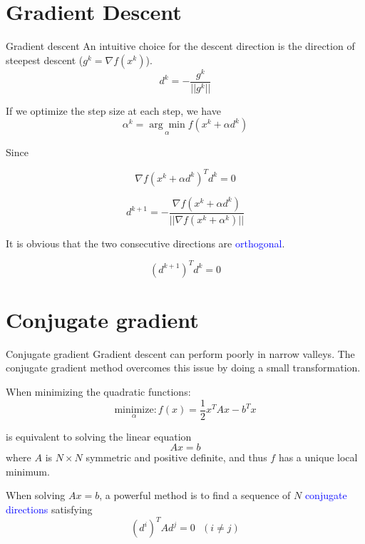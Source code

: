 \documentclass{beamer}
\begin{document}
\section{Gradient Descent}
\begin{frame}{Gradient descent}
An intuitive choice for the descent direction is the direction of steepest descent ($g^k = \nabla f(x^k)$).
\begin{equation*}
    d^k = - \frac{g^k}{||g^k||}
\end{equation*}

If we optimize the step size at each step, we have
\begin{equation*}
    \alpha^k = \underset{\alpha}{\arg \min} f(x^k + \alpha d^k)
\end{equation*}

Since 

\begin{equation*}
    \nabla f(x^k + \alpha d^k)^T d^k = 0
\end{equation*}

\begin{equation*}
    d^{k+1} = - \frac{\nabla f(x^k + \alpha d^k)}{||\nabla f(x^k + \alpha^k)||}
\end{equation*}

It is obvious that the two consecutive directions are \textcolor{blue}{orthogonal}.

\begin{equation*}
	(d^{k+1})^T d^k = 0
\end{equation*}

\end{frame}

\section{Conjugate gradient}
\begin{frame}{Conjugate gradient}
Gradient descent can perform poorly in narrow valleys. The conjugate gradient method overcomes this issue by doing a small transformation.

When minimizing the quadratic functions:
\begin{equation*}
    \underset{\alpha}{\textrm{minimize}}: f(x) = \frac{1}{2} x^T A x - b^T x 
\end{equation*}

is equivalent to solving the linear equation
\begin{equation*}
    Ax = b
\end{equation*}
where $A$ is $N \times N$ symmetric and positive definite, and thus $f$ has a unique local minimum.

When solving $Ax = b$, a powerful method is to find a sequence of $N$ \textcolor{blue}{conjugate directions} satisfying 
\begin{equation*}
		(d^i)^T A d^j = 0 ~~~ (i\neq j)
\end{equation*}

\end{frame}
\end{document}
